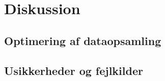 \documentclass[main]{subfiles}
\begin{document}
\section{Diskussion}
\subsection{Optimering af dataopsamling}
\subsection{Usikkerheder og fejlkilder}
\end{document}
